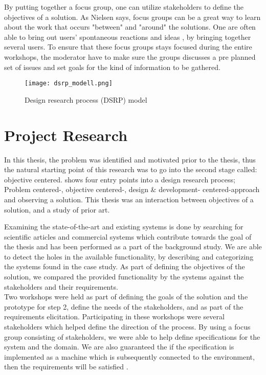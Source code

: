 By putting together a focus group, one can utilize stakeholders to define the
objectives of a solution. As Nielsen \cite{FocusGroupstoStudyWorkPractice} 
says, focus groups can be a great way to learn about the work that occurs 
"between" and "around" the solutions. One are often able to bring out users' 
spontaneous reactions and ideas \cite{nielsen1997use}, by bringing together 
several users. To ensure that these focus groups stays focused during the 
entire workshops, the moderator have to make sure the groups discusses a pre 
planned set of issues and set goals for the kind of information to be gathered.


\begin{figure}[!htbp]
	\texttt{[image: dsrp\_modell.png]}
	\caption[Design science research process (DSRP) model]{Design research process (DSRP)
	model\cite{peffers2006design}}
	\label{fig:DSRP}
\end{figure}



\section{Project Research} %
\label{sec:workshops}
In this thesis, the problem was 
identified and motivated prior to the thesis, thus the natural starting 
point of this research was to go into the second stage called: objective 
centered.  shows four entry points into a design 
research process; Problem centered-, objective centered-, design \& development-
centered-approach and observing a solution. This thesis was an interaction 
between objectives of a solution, and a study of prior art.

Examining the state-of-the-art and existing systems is done by searching for
scientific articles and commercial systems which contribute towards the goal 
of the thesis and has been performed as a part of the background study.
We are able to detect the holes in the available functionality, by describing
and categorizing the systems found in the case study. As part of defining the
objectives of the solution, we compared the provided functionality by the
systems against the stakeholders and their requirements.\\

Two workshops were held as part of defining the goals of the solution and the prototype for step 2, define the needs of the stakeholders, and as part of the requirements elicitation. Participating in these workshops were 
several stakeholders which helped define the direction of the process. By using 
a focus group consisting of stakeholders, we were able to help define 
specifications for the system and the domain. We are also guaranteed the if 
the specification is implemented as a machine which is subsequently connected 
to the environment, then the requirements will be satisfied \cite{zave1997four}. 

